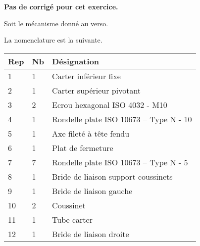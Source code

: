 \normalfalse \difficiletrue \tdifficilefalse
\correctionfalse

\setcounter{numques}{0}

\ifcorrection
\else
\textbf{Pas de corrigé pour cet exercice.}
\fi

\ifprof
\else
Soit le mécanisme donné au verso.
\fi


\ifprof
\else
La nomenclature est la suivante. 
\begin{multicols}{2}
\begin{center}
\begin{tabular}{|l|l|l|}
\hline
Rep & Nb  & Désignation \\ \hline \hline %
1 & 1 & Carter inférieur fixe  \\ \hline %
2&
1&
Carter supérieur pivotant\\ \hline %
3&
2 &
Ecrou hexagonal ISO 4032 - M10 \\ \hline %
4&
1&
Rondelle plate ISO 10673 – Type N - 10 \\ \hline %
5&
1&
Axe fileté à tête fendu \\ \hline %
6&
1&
Plat de fermeture%
\\ \hline %
7&
7&
Rondelle plate ISO 10673 -- Type N - 5 \\ \hline %
8&
1&
Bride de liaison support coussinets \\ \hline %
9&
1&
Bride de liaison gauche \\ \hline %
10&
2&
Coussinet \\ \hline %
11&
1&
Tube carter \\ \hline %
12&
1&
Bride de liaison droite \\ \hline %

\end{tabular}
\end{center}
\end{multicols}
